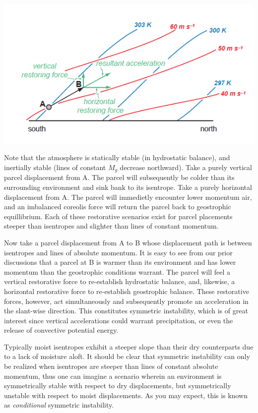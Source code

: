 \documentclass[a4paper,12pt]{article}
\begin{document}
\includegraphics[width=\textwidth]{sym_ins}

 Note that the atmosphere is statically stable (in hydrostatic balance), and inertially stable (lines of constant $M_g$ decrease northward). Take a purely vertical parcel displacement from A. The parcel will subsequently be colder than its surrounding environment and sink bank to its isentrope. Take a purely horizontal displacement from A. The parcel will immedietly encounter lower momentum air, and an imbalanced coreolis force will return the parcel back to geostrophic equillibrium. Each of these restorative scenarios exist for parcel placements steeper than isentropes and slighter than lines of constant momentum. 

Now take a parcel displacement from A to B whose displacement path is between isentropes and lines of absolute momentum. It is easy to see from our prior discussions that a parcel at B is warmer than its environment and has lower momentum than the geostrophic conditions warrant. The parcel will feel a vertical restorative force to re-establish hydrostatic balance, and, likewise, a horizontal restorative force to re-establish geostrophic balance. These restorative forces, however, act simultaneously and subsequently promote an acceleration in the slant-wise direction. This constitutes symmetric instability, which is of great interest since vertical accelerations could warrant precipitation, or even the release of convective potential energy.

Typically moist isentropes exhibit a steeper slope than their dry counterparts due to a lack of moisture aloft. It should be clear that symmetric instability can only be realized when isentropes are steeper than lines of constant absolute momentum, thus one can imagine a scenario wherein an environment is symmetrically stable with respect to dry displacements, but symmetrically unstable with respect to moist displacements. As you may expect, this is known as \emph{conditional} symmetric instability.
\end{document}
